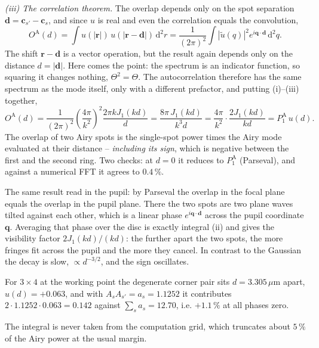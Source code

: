 \emph{(iii) The correlation theorem.} The overlap depends only on the spot
separation $\mathbf d=\mathbf c_{s'}-\mathbf c_s$, and since $u$ is real and
even the correlation equals the convolution,
\begin{equation}
O^\mathrm{A}(d)=\int\! u(|\mathbf r|)\,u(|\mathbf r-\mathbf d|)\,\mathrm d^2r
=\frac{1}{(2\pi)^2}\int\!\left|\tilde u(q)\right|^2
e^{i\mathbf q\cdot\mathbf d}\,\mathrm d^2q .
\end{equation}
The shift $\mathbf r-\mathbf d$ is a vector operation, but the result again
depends only on the distance $d=|\mathbf d|$.
Here comes the point: the spectrum is an indicator function, so squaring it
changes nothing, $\Theta^2=\Theta$. The autocorrelation therefore has the same
spectrum as the mode itself, only with a different prefactor, and putting
(i)--(iii) together,
\begin{equation}
O^\mathrm{A}(d)
=\frac{1}{(2\pi)^2}\left(\frac{4\pi}{k^2}\right)^{\!2}\frac{2\pi k J_1(kd)}{d}
=\frac{8\pi\,J_1(kd)}{k^3 d}
=\frac{4\pi}{k^2}\cdot\frac{2J_1(kd)}{kd}
=P_1^\mathrm{A}\,u(d) .
\end{equation}
The overlap of two Airy spots is the single-spot power times the Airy mode
evaluated at their distance -- \emph{including its sign}, which is negative
between the first and the second ring. Two checks: at $d=0$ it reduces to
$P_1^\mathrm{A}$ (Parseval), and against a numerical FFT it agrees to
$0.4\,\%$.

The same result read in the pupil: by Parseval the overlap in the focal plane
equals the overlap in the pupil plane. There the two spots are two plane waves
tilted against each other, which is a linear phase $e^{i\mathbf q\cdot\mathbf
d}$ across the pupil coordinate $\mathbf q$. Averaging that phase over the disc
is exactly integral (ii) and gives the visibility factor $2J_1(kd)/(kd)$: the
further apart the two spots, the more fringes fit across the pupil and the more
they cancel. In contrast to the Gaussian the decay is slow, $\propto
d^{-3/2}$, and the sign oscillates.

For $3\times4$ at the working point the degenerate corner pair sits
$d=3.305\,\mu$m apart, $u(d)=+0.063$, and with $A_sA_{s'}=a_s=1.1252$ it
contributes $2\cdot1.1252\cdot0.063=0.142$ against $\sum_sa_s=12.70$, i.e.
$+1.1\,\%$ at all phases zero.

The integral is never taken from the computation grid, which truncates about
$5\,\%$ of the Airy power at the usual margin.

